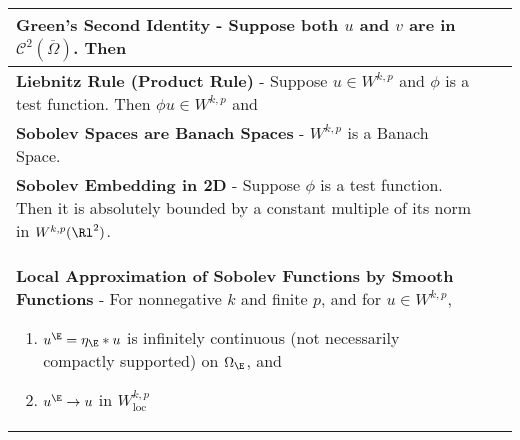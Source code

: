 \begin{longtable}{|*{3}{>{\centering\arraybackslash}p{}|}}
            \textbf{Green's Second Identity} - Suppose both $u$ and $v$ are in $\mathcal{C}^2(\overline{\Omega})$.  Then \newline {$\!\begin{gathered} \int_\Omega (v \laplacian u - u \laplacian v) \dd x = \int_{\partial \Omega} \qty[v \frac{\partial u}{\partial N} - u \frac{\partial v}{\partial N}]\dd S. \end{gathered}$}
            &
            
            \\[6pt] \hline
            
            \textbf{Liebnitz Rule (Product Rule)} - Suppose $u \in W^{k,p}$ and $\phi$ is a test function.  Then $\phi u \in W^{k,p}$ and \newline {$\!\begin{gathered} D^\alpha(\phi u) = \sum_{\abs{\beta} \leq \abs{\alpha}} \binom{\alpha}{\beta}D^\alpha \phi D^{\alpha - \beta} u \end{gathered}$}
            &
            
            \\[6pt] \hline
            
            \textbf{Sobolev Spaces are Banach Spaces} - $W^{k,p}$ is a Banach Space.
            &
            
            \\[6pt] \hline
            
            \textbf{Sobolev Embedding in 2D} - Suppose $\phi$ is a test function.  Then it is absolutely bounded by a constant multiple of its norm in $W^{k,p}(\Rl^2)$. \newline {$\!\begin{gathered} \max_{x\in\Rl^2}\abs{u(x)} \leq C \norm{u}_{W^{k,p}(\Rl^2)} \end{gathered}$}
            &
            
            \\[6pt] \hline
            
            \textbf{Local Approximation of Sobolev Functions by Smooth Functions} - For nonnegative $k$ and finite $p$, and for $u \in W^{k,p}$, \begin{enumerate}
                \item
                    $u^\E = \eta_\E * u$ is infinitely continuous (not necessarily compactly supported) on $\Omega_\E$, and
                \item
                    $u^\E \rightarrow u$ in $W_\text{loc}^{k,p}$
            \end{enumerate}
            &
            

\end{longtable}
